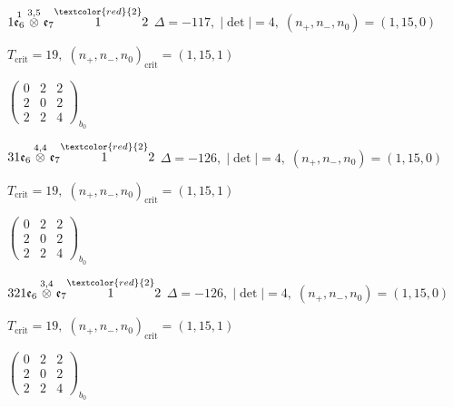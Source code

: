 \documentclass[10pt]{article}
\begin{document}
\smallskip

$1\overset{1}{\mathfrak{e}_6}\overset{3,5}{\otimes}\mathfrak{e}_7\overset{\textcolor{red}{2}}{1}2$ \quad $\Delta=-117,\; |\det|=4,\; (n_+,n_-,n_0)=(1,15,0)$

\hspace{1em}$T_{\text{crit}}=19,\; (n_+,n_-,n_0)_{\text{crit}}=(1,15,1)$

\hspace{2em}$\left(\begin{smallmatrix}0 & 2 & 2 \\ 2 & 0 & 2 \\ 2 & 2 & 4\end{smallmatrix}\right)_{\!b_0}$

\smallskip

$31\mathfrak{e}_6\overset{4,4}{\otimes}\mathfrak{e}_7\overset{\textcolor{red}{2}}{1}2$ \quad $\Delta=-126,\; |\det|=4,\; (n_+,n_-,n_0)=(1,15,0)$

\hspace{1em}$T_{\text{crit}}=19,\; (n_+,n_-,n_0)_{\text{crit}}=(1,15,1)$

\hspace{2em}$\left(\begin{smallmatrix}0 & 2 & 2 \\ 2 & 0 & 2 \\ 2 & 2 & 4\end{smallmatrix}\right)_{\!b_0}$

\smallskip

$321\mathfrak{e}_6\overset{3,4}{\otimes}\mathfrak{e}_7\overset{\textcolor{red}{2}}{1}2$ \quad $\Delta=-126,\; |\det|=4,\; (n_+,n_-,n_0)=(1,15,0)$

\hspace{1em}$T_{\text{crit}}=19,\; (n_+,n_-,n_0)_{\text{crit}}=(1,15,1)$

\hspace{2em}$\left(\begin{smallmatrix}0 & 2 & 2 \\ 2 & 0 & 2 \\ 2 & 2 & 4\end{smallmatrix}\right)_{\!b_0}$

\smallskip
\end{document}
